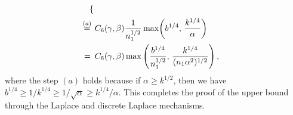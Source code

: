 \documentclass[twoside,11pt]{article}
\newcommand{\alphabetSize}{k} %
\newcommand{\sampleSize}{n}
\newcommand{\privacyParameter}{\alpha} %
\begin{document}
\begin{appendix}
\begin{align*}
\begin{cases}
		\end{cases}
		\\ \stackrel{(a)}{=} \hskip 1.37mm &
		C_6(\gamma, \beta) 
		\frac{1}{\sampleSize_1^{1/2}}
		\max
		\biggl(
		{b}^{1/4}, \,
		\frac{\alphabetSize^{1/4}}{\privacyParameter}
		\biggr)
		\\ = \hskip 1.74mm  &
		C_6(\gamma, \beta) 
		\max\left(
		\frac
		{{b}^{1/4}}
		{\sampleSize_1^{1/2}}, \,
		\frac
		{\alphabetSize^{1/4}}
		{(\sampleSize_1 \privacyParameter^2)^{1/2}}
		\right),
	\end{align*}
	where the step $(a)$ holds because if $\alpha \geq \alphabetSize^{1/2}$, then we have
	$
	{b}^{1/4}
	\geq
	1 / \alphabetSize^{1/4}
	\geq 
	1 / \sqrt{\privacyParameter}
	\geq
	\alphabetSize^{1/4} / \privacyParameter.
	$
	This completes the proof of the upper bound through the Laplace and discrete Laplace mechanisms.
	

\end{appendix}
\end{document}
